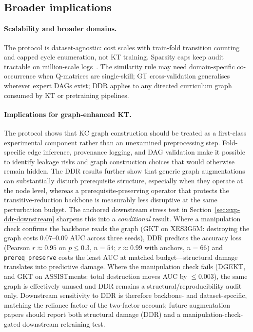 \documentclass[pdflatex,sn-mathphys-num]{sn-jnl}
\newcommand{\DDR}{\textsc{DDR}}
\begin{document}
\subsection{Broader implications}
\label{sec:disc-implications}

\paragraph{Scalability and broader domains.}
The protocol is dataset-agnostic: cost scales with train-fold transition
counting and capped cycle enumeration, not KT training. Sparsity caps keep
audit tractable on million-scale logs~\cite{choi2020ednet}. The similarity
rule may need domain-specific co-occurrence when Q-matrices are single-skill;
GT cross-validation generalises wherever expert DAGs exist; \DDR{} applies to
any directed curriculum graph consumed by KT or pretraining pipelines.

\paragraph{Implications for graph-enhanced KT.}
The protocol shows that KC graph construction should be treated as a
first-class experimental component rather than an unexamined
preprocessing step. Fold-specific edge inference, provenance logging,
and DAG validation make it possible to identify leakage risks and graph
construction choices that would otherwise remain hidden. The \DDR{}
results further show that generic graph augmentations can substantially
disturb prerequisite structure, especially when they operate at the node
level, whereas a prerequisite-preserving operator that protects the
transitive-reduction backbone is measurably less disruptive at the same
perturbation budget. The anchored downstream stress test in
Section~\ref{sec:exp-ddr-downstream} sharpens this into a \emph{conditional}
result. Where a manipulation check confirms the backbone reads the graph
(GKT on XES3G5M: destroying the graph costs $0.07$--$0.09$ AUC across three seeds), \DDR{}
predicts the accuracy loss (Pearson $r{\approx}0.95$ on $p{\le}0.3$, $n{=}54$;
$r{\approx}0.99$ with anchors, $n{=}66$) and \texttt{prereq\_preserve} costs the
least AUC at matched budget---structural damage translates into predictive
damage. Where the manipulation check fails (DGEKT, and GKT on ASSISTments:
total destruction moves AUC by ${\le}0.003$), the same graph is effectively
unused and \DDR{} remains a structural/reproducibility audit only. Downstream
sensitivity to \DDR{} is therefore backbone- and dataset-specific, matching the
reliance factor of the two-factor account; future augmentation papers should
report both structural damage (\DDR{}) and a manipulation-check-gated
downstream retraining test.
\end{document}
